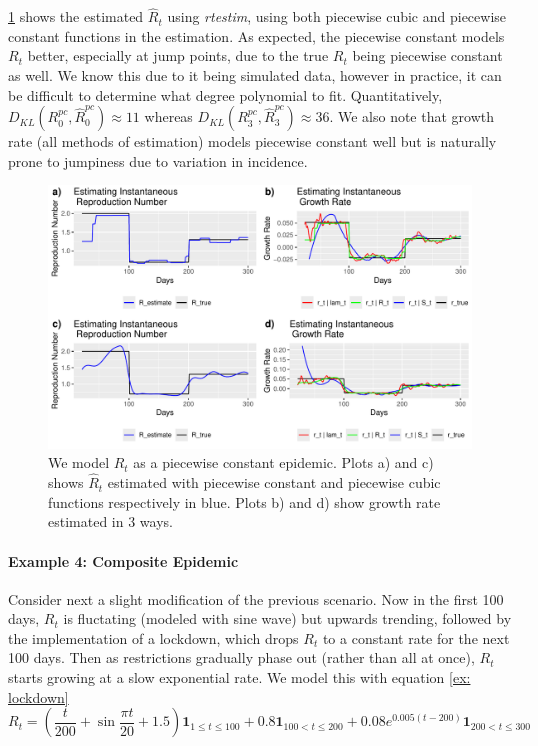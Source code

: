 \documentclass[12pt]{article}
\begin{document}
    \cref{fig: pc} shows the estimated $\hat{R}_t$ using \textit{rtestim}, using both piecewise cubic and piecewise constant functions 
    in the estimation. As expected, the piecewise constant models $R_t$ better, especially at jump points, due to the true $R_t$ being piecewise constant as well. We know this due to it being simulated data, however in practice, it can be difficult to determine what degree polynomial to fit. Quantitatively, $D_{KL}(R_0^{pc}, \hat{R}_0^{pc}) \approx 11$ whereas $D_{KL}(R_3^{pc}, \hat{R}_3^{pc}) \approx 36$.
    We also note that growth rate (all methods of estimation) models piecewise constant well but is naturally prone to jumpiness due to variation in incidence.

    \begin{figure}[h]
      \centering
      \includegraphics[scale = 0.75]{epi_pc.pdf}
      \caption{We model $R_t$ as a piecewise constant epidemic. Plots a) and c) shows $\hat{R}_t$ estimated with piecewise constant and piecewise cubic functions respectively in blue. Plots b) and d) show growth rate estimated in 3 ways.}
      \label{fig: pc}
    \end{figure}
    
    \paragraph{Example 4: Composite Epidemic} Consider next a slight modification of the previous scenario. Now in the first 100 days, $R_t$ is fluctating (modeled with sine wave) but upwards trending, followed
    by the implementation of a lockdown, which drops $R_t$ to a constant rate for the next 100 days. Then as restrictions gradually phase out (rather than all at once), 
    $R_t$ starts growing at a slow exponential rate. We model this with equation \cref{ex: lockdown}
    \begin{equation} \label{ex: lockdown}
      R_t = \left( \frac{t}{200} + \sin{\frac{\pi t}{20}} + 1.5 \right)\mathbf{1}_{1 \leq t \leq 100} + 0.8 \mathbf{1}_{100 < t \leq 200}
      + 0.08 e^{0.005 (t - 200)} \mathbf{1}_{200 < t \leq 300}
    \end{equation}
\end{document}
